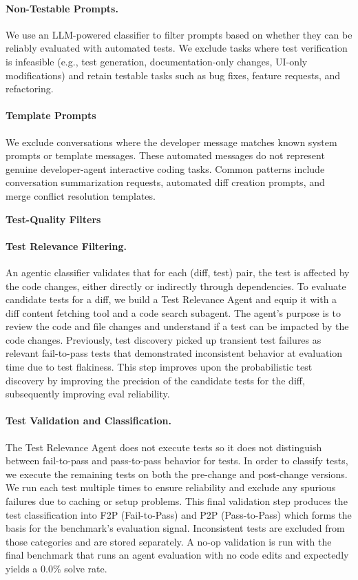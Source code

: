\paragraph{Non-Testable Prompts.} We use an LLM-powered classifier to filter prompts based on whether they can be reliably evaluated with automated tests. We exclude tasks where test verification is infeasible (e.g., test generation, documentation-only changes, UI-only modifications) and retain testable tasks such as bug fixes, feature requests, and refactoring.

\paragraph{Template Prompts}
We exclude conversations where the developer message matches known system prompts or template messages. These automated messages do not represent genuine developer-agent interactive coding tasks. Common patterns include conversation summarization requests, automated diff creation prompts, and merge conflict resolution templates.


\vspace{1em}
\textbf{Test-Quality Filters}
\paragraph{Test Relevance Filtering.} An agentic classifier validates that for each (diff, test) pair, the test is affected by the code changes, either directly or indirectly through dependencies. To evaluate candidate tests for a diff, we build a Test Relevance Agent and equip it with a diff content fetching tool and a code search subagent. The agent's purpose is to review the code and file changes and understand if a test can be impacted by the code changes. Previously, test discovery picked up transient test failures as relevant fail-to-pass tests that demonstrated inconsistent behavior at evaluation time due to test flakiness. This step improves upon the probabilistic test discovery by improving the precision of the candidate tests for the diff, subsequently improving eval reliability.


\paragraph{Test Validation and Classification.} The Test Relevance Agent does not execute tests so it does not distinguish between fail-to-pass and pass-to-pass behavior for tests. In order to classify tests, we execute the remaining tests on both the pre-change and post-change versions. We run each test multiple times to ensure reliability and exclude any spurious failures due to caching or setup problems. This final validation step produces the test classification into F2P (Fail-to-Pass) and P2P (Pass-to-Pass) which forms the basis for the benchmark's evaluation signal. Inconsistent tests are excluded from those categories and are stored separately. A no-op validation is run with the final benchmark that runs an agent evaluation with no code edits and expectedly yields a 0.0\% solve rate.

